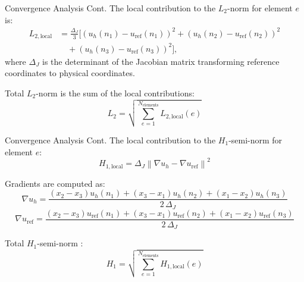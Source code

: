 \documentclass{beamer}
\begin{document}




\begin{frame}{Convergence Analysis Cont.}
    The local contribution to the \( L_2 \)-norm for element \( e \) is:
\begin{equation*}
\begin{split}
L_{2, \text{local}} &= \frac{\Delta_J}{3} \big[ (u_h(n_1) - u_{\text{ref}}(n_1))^2 + (u_h(n_2) - u_{\text{ref}}(n_2))^2 \\
&\quad + (u_h(n_3) - u_{\text{ref}}(n_3))^2 \big],
\end{split}
\end{equation*}
where $\Delta_J$ is the determinant of the Jacobian matrix transforming reference coordinates to physical coordinates.

Total \( L_2 \)-norm is the sum of the local contributions:
\[
L_2 = \sqrt{\sum_{e=1}^{N_{\text{elements}}} L_{2, \text{local}}(e)}
\]
\end{frame}
\begin{frame}{Convergence Analysis Cont.}
The local contribution to the \( H_1 \)-semi-norm for element \( e \):
\[
H_{1, \text{local}} = \Delta_J \left\| \nabla u_h - \nabla u_{\text{ref}} \right\|^2
\]

Gradients are computed as:
\[
\nabla u_h = \frac{(x_2 - x_3) u_h(n_1) + (x_3 - x_1) u_h(n_2) + (x_1 - x_2) u_h(n_3)}{2 \, \Delta_J}
\]
\[
\nabla u_{\text{ref}} = \frac{(x_2 - x_3) u_{\text{ref}}(n_1) + (x_3 - x_1) u_{\text{ref}}(n_2) + (x_1 - x_2) u_{\text{ref}}(n_3)}{2 \, \Delta_J}
\]

Total \( H_1 \)-semi-norm :
\[
H_1 = \sqrt{\sum_{e=1}^{N_{\text{elements}}} H_{1, \text{local}}(e)}
\]
\end{frame}
\end{document}
